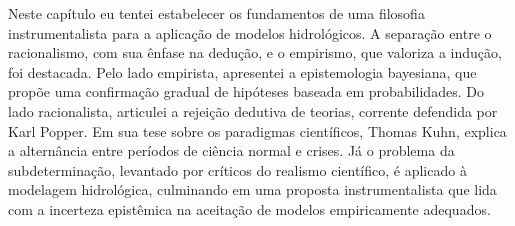\documentclass[./main.tex]{subfiles}
\begin{document}
\par Neste capítulo eu tentei estabelecer os fundamentos de uma filosofia instrumentalista para a aplicação de modelos hidrológicos. A separação entre o racionalismo, com sua ênfase na dedução, e o empirismo, que valoriza a indução, foi destacada. Pelo lado empirista, apresentei a epistemologia bayesiana, que propõe uma confirmação gradual de hipóteses baseada em probabilidades. Do lado racionalista, articulei a rejeição dedutiva de teorias, corrente defendida por Karl Popper. Em sua tese sobre os paradigmas científicos, Thomas Kuhn, explica a alternância entre períodos de ciência normal e crises. Já o problema da subdeterminação, levantado por críticos do realismo científico, é aplicado à modelagem hidrológica, culminando em uma proposta instrumentalista que lida com a incerteza epistêmica na aceitação de modelos empiricamente adequados.
\end{document}
